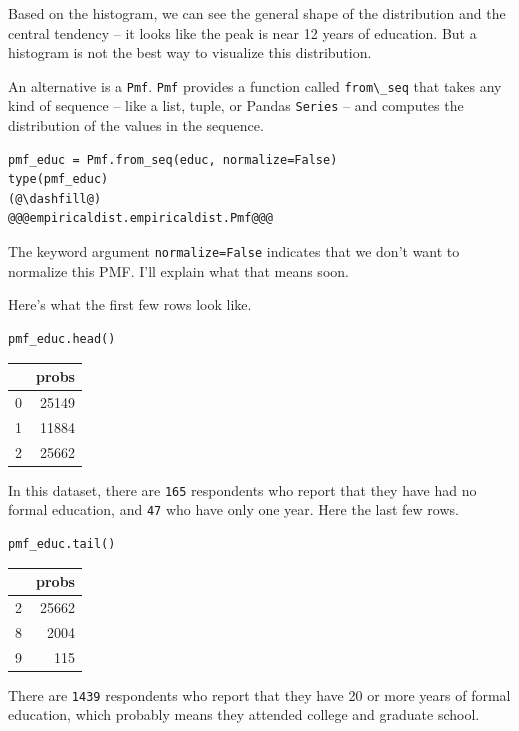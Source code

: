 Based on the histogram, we can see the general shape of the distribution
and the central tendency -- it looks like the peak is near 12 years of
education. But a histogram is not the best way to visualize this
distribution.

An alternative is a \passthrough{\lstinline!Pmf!}.
\passthrough{\lstinline!Pmf!} provides a function called
\passthrough{\lstinline!from\_seq!} that takes any kind of sequence --
like a list, tuple, or Pandas \passthrough{\lstinline!Series!} -- and
computes the distribution of the values in the sequence.

\begin{lstlisting}[]
pmf_educ = Pmf.from_seq(educ, normalize=False)
type(pmf_educ)
(@\dashfill@)
@@@empiricaldist.empiricaldist.Pmf@@@
\end{lstlisting}

The keyword argument \passthrough{\lstinline!normalize=False!} indicates
that we don't want to normalize this PMF. I'll explain what that means
soon.

Here's what the first few rows look like.

\begin{lstlisting}[]
pmf_educ.head()
\end{lstlisting}

\begin{tabular}{lr}
\midrule
{} &  probs \\
\midrule
0 &  25149 \\
1 &  11884 \\
2 &  25662 \\
\midrule
\end{tabular}

In this dataset, there are \passthrough{\lstinline!165!} respondents who
report that they have had no formal education, and
\passthrough{\lstinline!47!} who have only one year. Here the last few
rows.

\begin{lstlisting}[]
pmf_educ.tail()
\end{lstlisting}

\begin{tabular}{lr}
\midrule
{} &  probs \\
\midrule
2 &  25662 \\
8 &   2004 \\
9 &    115 \\
\midrule
\end{tabular}

There are \passthrough{\lstinline!1439!} respondents who report that
they have 20 or more years of formal education, which probably means
they attended college and graduate school.

